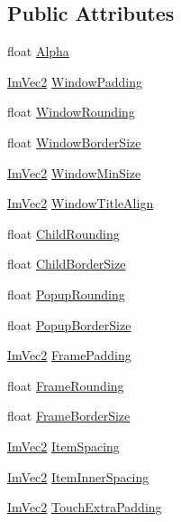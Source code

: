 \subsection*{Public Attributes}
\begin{DoxyCompactItemize}
\item 
float \hyperlink{struct_im_gui_style_a993312606e9dcb7ca165245150a4da72}{Alpha}
\item 
\hyperlink{struct_im_vec2}{Im\+Vec2} \hyperlink{struct_im_gui_style_a37f156b53e6dcc99ff57366ceafe8b50}{Window\+Padding}
\item 
float \hyperlink{struct_im_gui_style_acd902c2ab4b53d4bb0f64da608320894}{Window\+Rounding}
\item 
float \hyperlink{struct_im_gui_style_a4e2af4dd711f57ee841f9c843a18bec2}{Window\+Border\+Size}
\item 
\hyperlink{struct_im_vec2}{Im\+Vec2} \hyperlink{struct_im_gui_style_a060b2f743a086d0f0fee4cd5b3f372d4}{Window\+Min\+Size}
\item 
\hyperlink{struct_im_vec2}{Im\+Vec2} \hyperlink{struct_im_gui_style_a3fc57a15ab8f206045f1e5dfccd8b2e7}{Window\+Title\+Align}
\item 
float \hyperlink{struct_im_gui_style_aba2b4c6be52366ce2ac06b7849cd5cb2}{Child\+Rounding}
\item 
float \hyperlink{struct_im_gui_style_a5dd4fc33733ac7171d88740eb777f2e3}{Child\+Border\+Size}
\item 
float \hyperlink{struct_im_gui_style_a44b39e666946eea00001b6e38ab6bdc7}{Popup\+Rounding}
\item 
float \hyperlink{struct_im_gui_style_ac3bc5e785e360f72b580d419953c9db4}{Popup\+Border\+Size}
\item 
\hyperlink{struct_im_vec2}{Im\+Vec2} \hyperlink{struct_im_gui_style_af58dc4e954ac95fdb3b0df8efb2fa564}{Frame\+Padding}
\item 
float \hyperlink{struct_im_gui_style_a15402cededdef985487e986ccce73ad2}{Frame\+Rounding}
\item 
float \hyperlink{struct_im_gui_style_a21d8f1680e9f897998d726fdf0123bf2}{Frame\+Border\+Size}
\item 
\hyperlink{struct_im_vec2}{Im\+Vec2} \hyperlink{struct_im_gui_style_a6bc07d81e049cd75e86e6b3753c0da4a}{Item\+Spacing}
\item 
\hyperlink{struct_im_vec2}{Im\+Vec2} \hyperlink{struct_im_gui_style_a1a12021be99583fb491cff2df75d1ae1}{Item\+Inner\+Spacing}
\item 
\hyperlink{struct_im_vec2}{Im\+Vec2} \hyperlink{struct_im_gui_style_ab518a0a67df8f14765acc491d7b460f4}{Touch\+Extra\+Padding}

\end{DoxyCompactItemize}
